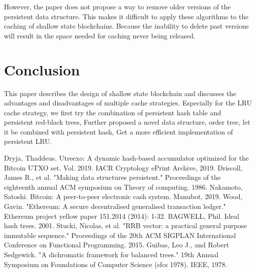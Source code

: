 \documentclass[conference]{IEEEtran}
\begin{document}
However, the paper does not propose a way to remove older versions of the persistent data structure.
This makes it difficult to apply these algorithms to the caching of shallow state blockchains.
Because the inability to delete past versions will result in the space needed for caching never being released.

\section{Conclusion}
This paper describes the design of shallow state blockchain and discusses the advantages and disadvantages of multiple cache strategies.
Especially for the LRU cache strategy, 
we first try the combination of persistent hash table and persistent red-black trees,
Further proposed a novel data structure, order tree, let it be combined with persistent hash,
Get a more efficient implementation of persistent LRU.

\begin{thebibliography}{00}
 Dryja, Thaddeus. Utreexo: A dynamic hash-based accumulator optimized for the Bitcoin UTXO set. Vol. 2019. IACR Cryptology ePrint Archive, 2019.
 Driscoll, James R., et al. "Making data structures persistent." Proceedings of the eighteenth annual ACM symposium on Theory of computing. 1986.
 Nakamoto, Satoshi. Bitcoin: A peer-to-peer electronic cash system. Manubot, 2019.
 Wood, Gavin. "Ethereum: A secure decentralised generalised transaction ledger." Ethereum project yellow paper 151.2014 (2014): 1-32.
 BAGWELL, Phil. Ideal hash trees. 2001.
 Stucki, Nicolas, et al. "RRB vector: a practical general purpose immutable sequence." Proceedings of the 20th ACM SIGPLAN International Conference on Functional Programming. 2015.
 Guibas, Leo J., and Robert Sedgewick. "A dichromatic framework for balanced trees." 19th Annual Symposium on Foundations of Computer Science (sfcs 1978). IEEE, 1978.
\end{thebibliography}
\vspace{12pt}
\end{document}
